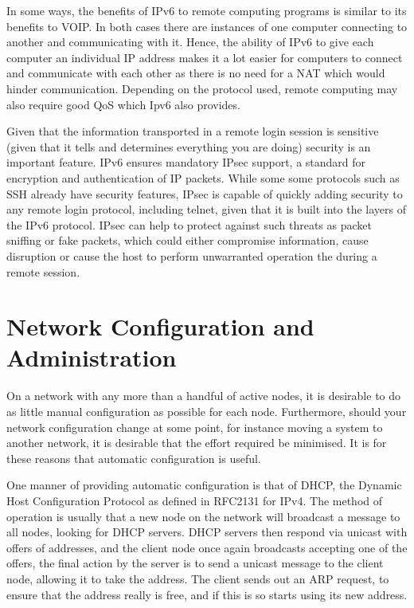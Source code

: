 \documentclass[a4paper,12pt]{article}
\begin{document}
In some ways, the benefits of IPv6 to remote computing programs is
similar to its benefits to VOIP. In both cases there are 
instances of one computer connecting to another and communicating with it. 
Hence, the ability of IPv6 to give each computer an individual IP address 
makes it a lot easier for computers to connect and communicate with each 
other as there is no need for a NAT which would hinder communication.
Depending on the protocol used, remote computing may also require good 
QoS which Ipv6 also provides.


Given that the information transported in a remote login session is
sensitive (given that it tells and determines everything you are doing)   
security is an important feature. IPv6 ensures mandatory IPsec support, a 
standard for encryption and authentication of IP packets. While some 
some protocols such as SSH already have security features, IPsec is   
capable of quickly adding security to any remote login protocol, 
including telnet, given that it is built into the layers of the IPv6 
protocol. IPsec can help to protect against such threats as packet 
sniffing or fake packets, which could either compromise information,
cause disruption or cause the host to perform unwarranted operation the
during a remote session.

\section{Network Configuration and Administration}

On a network with any more than a handful of active nodes, it is desirable to
do as little manual configuration as possible for each node. Furthermore,
should your network configuration change at some point, for instance moving a
system to another network, it is desirable that the effort required be
minimised. It is for these reasons that automatic configuration is useful.

One manner of providing automatic configuration is that of DHCP, the Dynamic
Host Configuration Protocol as defined in RFC2131 for IPv4. The method of
operation is usually that a new node on the network will broadcast a message to
all nodes, looking for DHCP servers. DHCP servers then respond via unicast with
offers of addresses, and the client node once again broadcasts accepting one of
the offers, the final action by the server is to send a unicast message to the
client node, allowing it to take the address. The client sends out an ARP
request, to ensure that the address really is free, and if this is so starts
using its new address.
\end{document}
